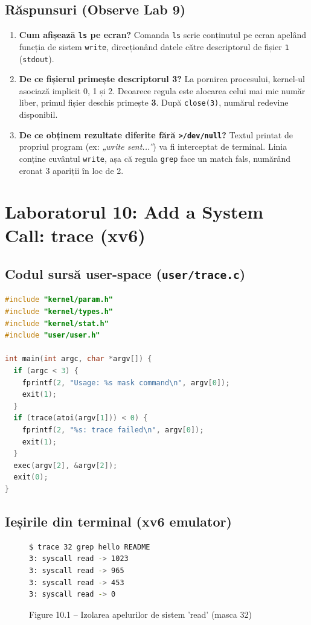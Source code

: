 \documentclass[12pt,a4paper]{article}
\begin{document}
\subsection{Răspunsuri (Observe Lab 9)}
\begin{enumerate}
    \item \textbf{Cum afișează \texttt{ls} pe ecran?} Comanda \texttt{ls} scrie conținutul pe ecran apelând funcția de sistem \texttt{write}, direcționând datele către descriptorul de fișier \texttt{1} (\texttt{stdout}).
    \item \textbf{De ce fișierul primește descriptorul 3?} La pornirea procesului, kernel-ul asociază implicit 0, 1 și 2. Deoarece regula este alocarea celui mai mic număr liber, primul fișier deschis primește \textbf{3}. După \texttt{close(3)}, numărul redevine disponibil.
    \item \textbf{De ce obținem rezultate diferite fără \texttt{>/dev/null}?} Textul printat de propriul program (ex: \textit{„write sent...”}) va fi interceptat de terminal. Linia conține cuvântul \texttt{write}, așa că regula \texttt{grep} face un match fals, numărând eronat 3 apariții în loc de 2.
\end{enumerate}

\section{Laboratorul 10: Add a System Call: trace (xv6)}
\subsection{Codul sursă user-space (\texttt{user/trace.c})}
\begin{lstlisting}[language=C]
#include "kernel/param.h"
#include "kernel/types.h"
#include "kernel/stat.h"
#include "user/user.h"

int main(int argc, char *argv[]) {
  if (argc < 3) {
    fprintf(2, "Usage: %s mask command\n", argv[0]);
    exit(1);
  }
  if (trace(atoi(argv[1])) < 0) {
    fprintf(2, "%s: trace failed\n", argv[0]);
    exit(1);
  }
  exec(argv[2], &argv[2]);
  exit(0);
}
\end{lstlisting}

\subsection{Ieșirile din terminal (xv6 emulator)}
\begin{figure}[h!]
\begin{lstlisting}[language=bash]
$ trace 32 grep hello README
3: syscall read -> 1023
3: syscall read -> 965
3: syscall read -> 453
3: syscall read -> 0
\end{lstlisting}
\caption{Figure 10.1 -- Izolarea apelurilor de sistem 'read' (masca 32)}
\end{figure}
\end{document}
